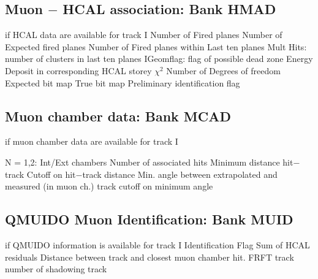 \subsection{\label{sec-TVAHMAD}Muon $-$ HCAL association: Bank HMAD}
\par
\begin{indentlist}{ 3.00cm}{ 3.25cm}
 if HCAL data are available for track
I
Number of Fired planes
Number of Expected fired planes
Number of Fired planes within Last ten planes
Mult Hits: number of clusters in last ten planes
IGeomflag: flag of possible dead zone
Energy Deposit in corresponding HCAL storey
$\chi^2$
Number of Degrees of freedom
Expected bit map
True bit map
Preliminary identification flag
\end{indentlist}
\subsection{\label{sec-TVAMCAD}Muon chamber data: Bank MCAD}
\par
\begin{indentlist}{ 3.00cm}{ 3.25cm}
if muon chamber data are available for track I
 
N = 1,2: Int/Ext chambers
Number of associated hits
Minimum distance hit$-$track
Cutoff on hit$-$track distance
Min. angle between extrapolated
and measured (in
muon ch.) track
cutoff on minimum angle
\end{indentlist}
\subsection{\label{sec-TVAMUID}QMUIDO Muon Identification: Bank MUID}
\par
\begin{indentlist}{ 3.00cm}{ 3.25cm}
if QMUIDO information is available for track I
Identification Flag
Sum of HCAL residuals
Distance between track and closest muon chamber hit.
FRFT track number of shadowing track
\end{indentlist}
